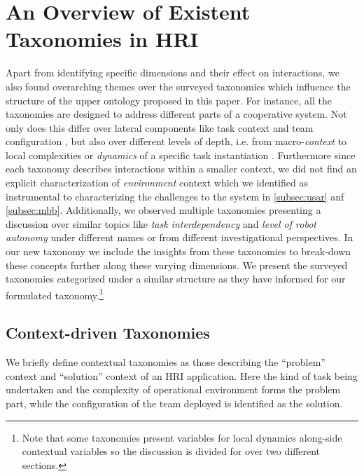 \documentclass[letterpaper, 10 pt, conference]{ieeeconf}  %
\theoremstyle{definition}
\begin{document}
\section{An Overview of Existent Taxonomies in HRI}
\label{sec:overview}

Apart from identifying specific dimensions and their effect on interactions, we also found overarching themes over the surveyed taxonomies which influence the structure of the upper ontology proposed in this paper.
For instance, all the taxonomies are designed to address different parts of a cooperative system.
Not only does this differ over lateral components like task context \cite{Beer2017} and team configuration \cite{Dudek2002updated, cao1997cooperative}, but also over different levels of depth, i.e. from macro-\textit{context} \cite{Yanco2004updated} to local complexities or \textit{dynamics} of a specific task instantiation \cite{Korsah2013, Beer2014toward}.
Furthermore since each taxonomy describes interactions within a smaller context, we did not find an explicit characterization of \textit{environment} context which we identified as instrumental to characterizing the challenges to the system in \ref{subsec:usar} anf \ref{subsec:mbb}.
Additionally, we observed multiple taxonomies presenting a discussion over similar topics like \textit{task interdependency} and \textit{level of robot autonomy} under different names or from different investigational perspectives.
In our new taxonomy we include the insights from these taxonomies to break-down these concepts further along these varying dimensions.
We present the surveyed taxonomies categorized under a similar structure as they have informed for our formulated taxonomy.\footnote{Note that some taxonomies present variables for local dynamics along-side contextual variables so the discussion is divided for over two different sections.}

\subsection{Context-driven Taxonomies}
We briefly define contextual taxonomies as those describing the ``problem'' context and ``solution'' context of an HRI application.
Here the kind of task being undertaken and the complexity of operational environment forms the problem part, while the configuration of the team deployed is identified as the solution.
\end{document}
